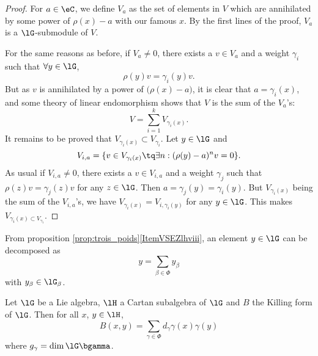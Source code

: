 \begin{proof}
For $a\in\eC$, we define $V_a$ as the set of elements in $V$ which are annihilated by some power of $\rho(x)-a$ with our famous $x$. By the first lines of the proof, $V_a$ is a $\lG$-submodule of $V$.

For the same reasons as before, if $V_a\neq 0$, there exists a $v\in V_a$ and a weight $\gamma_i$ such that $\forall y\in\lG$, 
\[
\rho(y)v=\gamma_i(y)v.
\]
But as $v$ is annihilated by a power of $\big( \rho(x)-a \big)$, it is clear that $a=\gamma_i(x)$, and some theory of linear endomorphism shows that $V$ is the sum of the $V_a$'s:
\begin{equation}
V=\sum_{i=1}^kV_{\gamma_i(x)}.
\end{equation}
It remains to be proved that $V_{\gamma_i(x)}\subset V_{\gamma_i}$. Let $y\in\lG$ and
\[
V_{i,a}=\{ v\in V_{\gamma_i(x)}\tq\exists n: (\rho(y)-a)^nv=0 \}.
\]
As usual if $V_{i,a}\neq 0$, there exists a $v\in V_{i,a}$ and a weight $\gamma_j$ such that $\rho(z)v=\gamma_j(z)v$ for any $z\in\lG$. Then $a=\gamma_j(y)=\gamma_i(y)$. But $V_{\gamma_i(x)}$ being the sum of the $V_{i,a}$'s, we have $V_{\gamma_i(x)}=V_{i,\gamma_i(y)}$ for any $y\in\lG$. This makes $V_{\gamma_i(x)\subset V_{\gamma_i}}$.

\end{proof}

From proposition \ref{prop:trois_poids}\ref{ItemVSEZlhviii}, an element $y\in\lG$ can be decomposed as
\begin{equation}\label{eq:decomp_racine}
    y=\sum_{\beta\in\Phi}y_{\beta}
\end{equation}
with $y_{\beta}\in\lG_{\beta}$.

\begin{theorem} \label{tho:Killing_Cartan}
    Let $\lG$ be a Lie algebra, $\lH$ a Cartan subalgebra of $\lG$ and $B$ the Killing form of $\lG$. Then for all $x$, $y\in\lH$,
    \begin{equation}
    B(x,y)=\sum_{\gamma\in\Phi}d_{\gamma}\gamma(x)\gamma(y)
    \end{equation}
    where $g_{\gamma}=\dim\lG\bgamma$.
\end{theorem}


